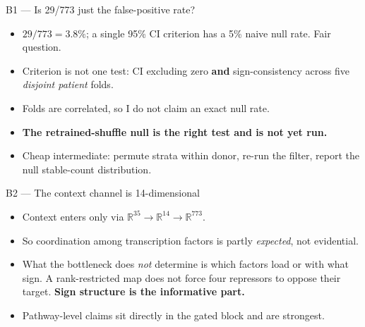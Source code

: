 \documentclass[aspectratio=169,10pt]{beamer}
\begin{document}
\begin{frame}{B1 --- Is 29/773 just the false-positive rate?}
  \begin{itemize}\small
    \item $29/773 = 3.8\%$; a single 95\% CI criterion has a 5\% naive null rate.
          Fair question.
    \item Criterion is not one test: CI excluding zero \textbf{and}
          sign-consistency across five \emph{disjoint patient} folds.
    \item Folds are correlated, so I do not claim an exact null rate.
    \item \textbf{The retrained-shuffle null is the right test and is not yet run.}
    \item Cheap intermediate: permute strata within donor, re-run the filter,
          report the null stable-count distribution.
  \end{itemize}
\end{frame}

\begin{frame}{B2 --- The context channel is 14-dimensional}
  \begin{itemize}\small
    \item Context enters only via $\mathbb{R}^{35}\to\mathbb{R}^{14}\to\mathbb{R}^{773}$.
    \item So coordination among transcription factors is partly \emph{expected},
          not evidential.
    \item What the bottleneck does \emph{not} determine is which factors load or
          with what sign. A rank-restricted map does not force four repressors to
          oppose their target. \textbf{Sign structure is the informative part.}
    \item Pathway-level claims sit directly in the gated block and are strongest.
  \end{itemize}
\end{frame}
\end{document}
